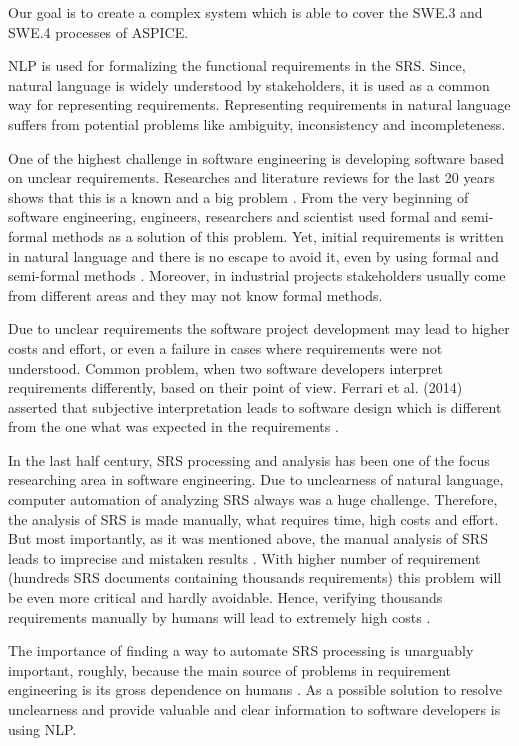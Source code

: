 	Our goal is to create a complex system which is able to cover the SWE.3 and SWE.4 processes of \gls{ASPICE}.
\begin{multicols}{2}	
	\gls{NLP} is used for formalizing the functional requirements in the \gls{SRS}. Since, natural language is widely understood by stakeholders, it is used as a common way for representing requirements. Representing requirements in natural language suffers from potential problems like ambiguity, inconsistency and incompleteness.
	
	One of the highest challenge in software engineering is developing software based on unclear requirements. Researches and literature reviews for the last 20 years shows that this is a known and a big problem \cite{Besrour}. From the very beginning of software engineering, engineers, researchers and scientist used formal and semi-formal methods as a solution of this problem. Yet, initial requirements is written in natural language and there is no escape to avoid it, even by using formal and semi-formal methods \cite{Kamsties}. Moreover, in industrial projects stakeholders usually come from different areas and they may not know formal methods.
	
	Due to unclear requirements the software project development may lead to higher costs and effort, or even a failure in cases where requirements were not understood.
	Common problem, when two software developers interpret requirements differently, based on their point of view. Ferrari et al. (2014) asserted that subjective interpretation leads to software design which is different from the one what was expected in the requirements \cite{Ferrari}.
	
	In the last half century, \gls{SRS} processing and analysis has been one of the focus researching area in software engineering. Due to unclearness of natural language, computer automation of analyzing \gls{SRS} always was a huge challenge. Therefore, the analysis of \gls{SRS} is made manually, what requires time, high costs and effort. But most importantly, as it was mentioned above, the manual analysis of \gls{SRS} leads to imprecise and mistaken results \cite{Wang}. With higher number of requirement (hundreds \gls{SRS} documents containing thousands requirements) this problem will be even more critical and hardly avoidable. Hence, verifying thousands requirements manually by humans will lead to extremely high costs \cite{Fanmuy}.
	
	The importance of finding a way to automate \gls{SRS} processing is unarguably important, roughly, because the main source of problems in requirement engineering is its gross dependence on humans \cite{Ahmed}. As a possible solution to resolve unclearness and provide valuable and clear information to software developers is using \gls{NLP}.
	

\end{multicols}
